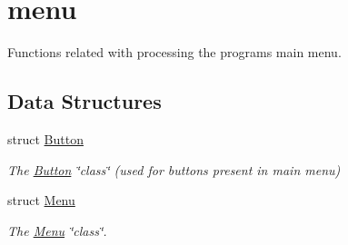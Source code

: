 \hypertarget{group__menu}{}\section{menu}
\label{group__menu}


Functions related with processing the program\textquotesingle{}s main menu.  


\subsection*{Data Structures}
\begin{DoxyCompactItemize}
\item 
struct \hyperlink{struct_button}{Button}
\begin{DoxyCompactList}\small\item\em The \hyperlink{struct_button}{Button} \char`\"{}class\char`\"{} (used for buttons present in main menu) \end{DoxyCompactList}\item 
struct \hyperlink{struct_menu}{Menu}
\begin{DoxyCompactList}\small\item\em The \hyperlink{struct_menu}{Menu} \char`\"{}class\char`\"{}. \end{DoxyCompactList}\end{DoxyCompactItemize}
